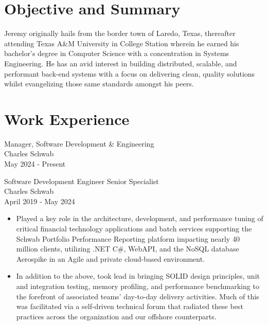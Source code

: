 \documentclass[11pt]{res} %
\begin{document}
 
 

\address{{\bf Current Address} \\   Austin, TX
         78747  \\ (956)286-8386}
\address{{\bf Contact Information} \\ jeremycantu.com \\ github.com/jac21 \\ mail@jeremycantu.com}
 
                                             
\begin{resume}
                                               
 
\section{Objective and Summary}
   Jeremy originally hails from the border town of Laredo, Texas, thereafter attending Texas A\&M University in College Station wherein he earned his bachelor's degree in Computer Science with a concentration in Systems Engineering. He has an avid interest in building distributed, scalable, and performant back-end systems with a focus on delivering clean, quality solutions whilst evangelizing those same standards amongst his peers.
 
\section{Work Experience}

Manager, Software Development \& Engineering \\
Charles Schwab \\
May 2024 - Present

Software Development Engineer Senior Specialist \\
Charles Schwab \\
April 2019 - May 2024
\vspace{0.2in}
   \begin{itemize} \itemsep -2pt  %
   \item Played a key role in the architecture, development, and performance tuning of critical financial technology applications and batch services supporting the Schwab Portfolio Performance Reporting platform impacting nearly 40 million clients, utilizing .NET C\#, WebAPI, and the NoSQL database Aerospike in an Agile and private cloud-based environment. 
\newline
    \item In addition to the above, took lead in bringing SOLID design principles, unit and integration testing, memory profiling, and performance benchmarking to the forefront of associated teams' day-to-day delivery activities. Much of this was facilitated via a self-driven technical forum that radiated these best practices across the organization and our offshore counterparts.
 \end{itemize}


\end{resume}
\end{document}
